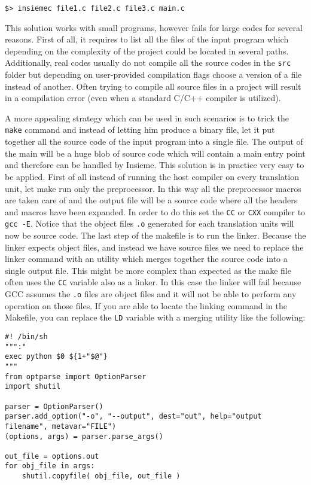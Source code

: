 \begin{verbatim}
$> insiemec file1.c file2.c file3.c main.c 
\end{verbatim}

This solution works with small programs, however fails for large codes for
several reasons. First of all, it requires to list all the files of the input
program which depending on the complexity of the project could be located in
several paths. Additionally, real codes usually do not compile all the source
codes in the {\tt src} folder but depending on user-provided compilation flags
choose a version of a file instead of another. Often trying to compile all
source files in a project will result in a compilation error (even when a
standard C/C++ compiler is utilized). 

A more appealing strategy which can be used in such scenarios is to trick the
{\tt make} command and instead of letting him produce a binary file, let it put
together all the source code of the input program into a single file. The
output of the main will be a huge blob of source code which will contain a main
entry point and therefore can be handled by Insieme. This solution is in
practice very easy to be applied. First of all instead of running the host
compiler on every translation unit, let make run only the preprocessor. In this
way all the preprocessor macros are taken care of and the output file will be a
source code where all the headers and macros have been expanded. In order to do
this set the {\tt CC} or {\tt CXX} compiler to {\tt gcc -E}. Notice that the
object files {\tt .o} generated for each translation units will now be source
code. The last step of the makefile is to run the linker. Because the linker
expects object files, and instead we have source files we need to replace the
linker command with an utility which merges together the source code into a
single output file. This might be more complex than expected as the make file
often uses the {\tt CC} variable also as a linker. In this case the linker will
fail because GCC assumes the {\tt .o} files are object files and it will not be
able to perform any operation on those files. If you are able to locate the
linking command in the Makefile, you can replace the {\tt LD} variable with a
merging utility like the following:

\begin{lstlisting}
#! /bin/sh
""":"
exec python $0 ${1+"$@"}
"""
from optparse import OptionParser
import shutil

parser = OptionParser()
parser.add_option("-o", "--output", dest="out", help="output filename", metavar="FILE")
(options, args) = parser.parse_args()

out_file = options.out
for obj_file in args:
	shutil.copyfile( obj_file, out_file )
\end{lstlisting}

